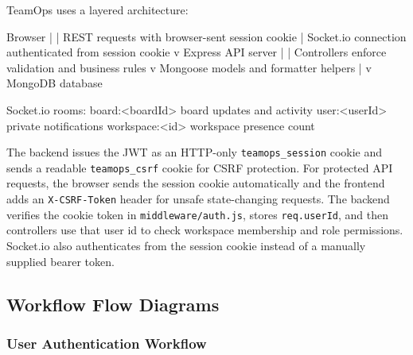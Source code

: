 \documentclass[
]{article}
\newenvironment{Shaded}{}{}
\newcommand{\NormalTok}[1]{#1}
\begin{document}
TeamOps uses a layered architecture:

\begin{Shaded}
\begin{Highlighting}[]
\NormalTok{Browser}
\NormalTok{  |}
\NormalTok{  | REST requests with browser{-}sent session cookie}
\NormalTok{  | Socket.io connection authenticated from session cookie}
\NormalTok{  v}
\NormalTok{Express API server}
\NormalTok{  |}
\NormalTok{  | Controllers enforce validation and business rules}
\NormalTok{  v}
\NormalTok{Mongoose models and formatter helpers}
\NormalTok{  |}
\NormalTok{  v}
\NormalTok{MongoDB database}

\NormalTok{Socket.io rooms:}
\NormalTok{  board:\textless{}boardId\textgreater{}      board updates and activity}
\NormalTok{  user:\textless{}userId\textgreater{}        private notifications}
\NormalTok{  workspace:\textless{}id\textgreater{}       workspace presence count}
\end{Highlighting}
\end{Shaded}

The backend issues the JWT as an HTTP-only \texttt{teamops\_session}
cookie and sends a readable \texttt{teamops\_csrf} cookie for CSRF
protection. For protected API requests, the browser sends the session
cookie automatically and the frontend adds an \texttt{X-CSRF-Token}
header for unsafe state-changing requests. The backend verifies the
cookie token in \texttt{middleware/auth.js}, stores \texttt{req.userId},
and then controllers use that user id to check workspace membership and
role permissions. Socket.io also authenticates from the session cookie
instead of a manually supplied bearer token.

\subsection{Workflow Flow Diagrams}\label{workflow-flow-diagrams}

\subsubsection{User Authentication
Workflow}\label{user-authentication-workflow}
\end{document}
